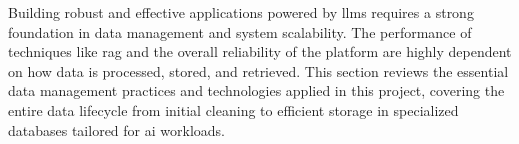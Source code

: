 Building robust and effective applications powered by \acp{llm} requires a strong foundation in data management and system scalability. The performance of techniques like \ac{rag} and the overall reliability of the platform are highly dependent on how data is processed, stored, and retrieved. This section reviews the essential data management practices and technologies applied in this project, covering the entire data lifecycle from initial cleaning to efficient storage in specialized databases tailored for \ac{ai} workloads.